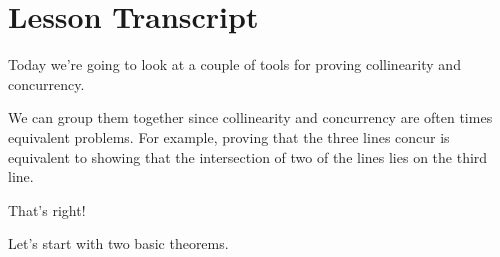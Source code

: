 \section{Lesson Transcript}














Today we're going to look at a couple of tools for proving collinearity and concurrency.

We can group them together since collinearity and concurrency are often times equivalent problems. For example, proving that the three lines concur is equivalent to showing that the intersection of two of the lines lies on the third line.


That's right!

Let's start with two basic theorems.




